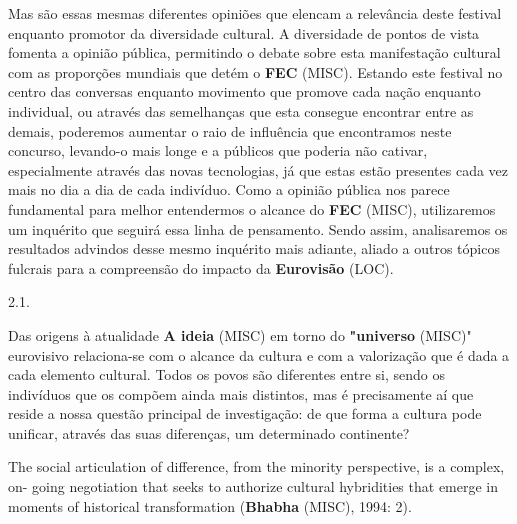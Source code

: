 \documentclass[12pt,a4paper]{article}
\begin{document}
Mas são essas mesmas diferentes opiniões que elencam a relevância deste festival enquanto promotor da diversidade cultural. A diversidade de pontos de vista fomenta a opinião pública, permitindo o debate sobre esta manifestação cultural com as proporções mundiais  que  detém  o  \textbf{FEC} (MISC).  Estando  este  festival  no  centro  das  conversas  enquanto movimento  que  promove  cada  nação  enquanto  individual,  ou  através  das  semelhanças que esta consegue encontrar entre as demais, poderemos aumentar o raio de influência que  encontramos  neste  concurso,  levando-o  mais  longe  e  a  públicos  que  poderia  não cativar,  especialmente  através das  novas tecnologias, já que  estas  estão  presentes  cada vez mais no dia a dia de cada indivíduo. Como a opinião pública nos parece fundamental para melhor entendermos o alcance do \textbf{FEC} (MISC), utilizaremos um inquérito que seguirá essa linha  de  pensamento.  Sendo  assim,  analisaremos  os  resultados  advindos  desse  mesmo inquérito mais adiante, aliado a outros tópicos fulcrais para a compreensão do impacto da \textbf{Eurovisão} (LOC).

2.1.

Das origens à atualidade \textbf{A ideia} (MISC) em torno do \textbf{"universo} (MISC)" eurovisivo relaciona-se com o alcance da cultura e com a valorização que é dada a cada elemento cultural. Todos os povos  são diferentes entre si, sendo os indivíduos que os compõem ainda mais distintos, mas é precisamente aí  que  reside  a  nossa  questão  principal  de  investigação:  de  que  forma  a  cultura  pode unificar, através das suas diferenças, um determinado continente?

The social articulation of difference, from the minority perspective, is a complex, on- going negotiation that seeks to authorize cultural hybridities that emerge in moments of historical transformation (\textbf{Bhabha} (MISC), 1994: 2).
\end{document}
